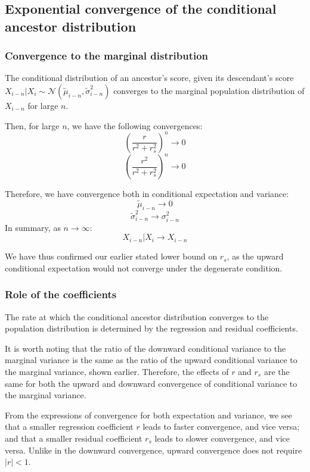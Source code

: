 \documentclass[letterpaper,10pt]{article} %
\begin{document}
\subsection{Exponential convergence of the conditional ancestor distribution}

\subsubsection*{Convergence to the marginal distribution}
The conditional distribution of an ancestor's score, given its descendant's score $X_{i-n}|X_i \sim \mathcal{N}( \tilde{\mu}_{i-n}, \tilde{\sigma}_{i-n}^2)$ converges to the marginal population distribution of $X_{i-n}$ for large $n$.

Then, for large $n$, we have the following convergences:
$$(\frac{r}{r^2+r_s^2})^n \rightarrow 0$$
$$(\frac{r^2}{r^2+r_s^2})^n \rightarrow 0$$

Therefore, we have convergence both in conditional expectation and variance:
$$\tilde{\mu}_{i-n} \rightarrow 0$$
$$\tilde{\sigma}_{i-n}^2 \rightarrow \sigma_{i-n}^2$$
In summary, as $n \rightarrow \infty$:
$$X_{i-n}|X_i \rightarrow X_{i-n}$$

We have thus confirmed our earlier stated lower bound on $r_s$, as the upward conditional expectation would not converge under the degenerate condition.


\subsubsection*{Role of the coefficients}
The rate at which the conditional ancestor distribution converges to the population distribution is determined by the regression and residual coefficients. 

It is worth noting that the ratio of the downward conditional variance to the marginal variance is the same as the ratio of the upward conditional variance to the marginal variance, shown earlier. Therefore, the effects of $r$ and $r_s$ are the same for both the upward and downward convergence of conditional variance to the marginal variance.

From the expressions of convergence for both expectation and variance, we see that a smaller regression coefficient $r$ leads to faster convergence, and vice versa; and that a smaller residual coefficient $r_s$ leads to slower convergence, and vice versa. Unlike in the downward convergence, upward convergence does not require $|r| < 1$.
\end{document}
